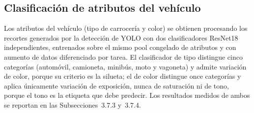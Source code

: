 \subsection{Clasificación de atributos del vehículo}

Los atributos del vehículo (tipo de carrocería y color) se obtienen procesando los
recortes generados por la detección de YOLO con dos clasificadores ResNet18
independientes, entrenados sobre el mismo pool congelado de atributos y con
aumento de datos diferenciado por tarea. El clasificador de tipo distingue cinco
categorías (automóvil, camioneta, minibús, moto y vagoneta) y admite variación de
color, porque su criterio es la silueta; el de color distingue once categorías y
aplica únicamente variación de exposición, nunca de saturación ni de tono, porque
el tono es la etiqueta que debe predecir. Los resultados medidos de ambos se
reportan en las Subsecciones~3.7.3 y~3.7.4.

